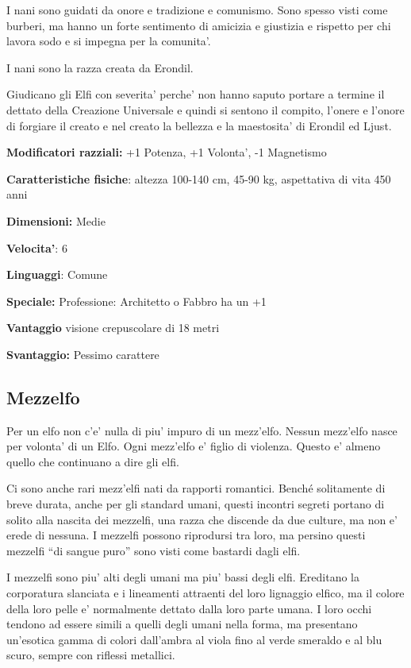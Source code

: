 \documentclass[a4paper,11pt,twoside,openany]{dndbook}
\begin{document}
I nani sono guidati da onore e tradizione e comunismo. Sono spesso visti come burberi, ma hanno un forte sentimento di amicizia e giustizia e rispetto per chi lavora sodo e si impegna per la comunita'.

I nani sono la razza creata da Erondil.

Giudicano gli Elfi con severita' perche' non hanno saputo portare a termine il dettato della Creazione Universale e quindi si sentono il compito, l'onere e l'onore di forgiare il creato e nel creato la bellezza e la maestosita' di Erondil ed Ljust. 

\textbf{Modificatori razziali:} +1 Potenza, +1 Volonta', -1 Magnetismo

\textbf{Caratteristiche fisiche}: altezza 100-140 cm, 45-90 kg, aspettativa
di vita 450 anni

\textbf{Dimensioni:} Medie

\textbf{Velocita'}: 6

\textbf{Linguaggi}: Comune

\textbf{Speciale:} Professione: Architetto o Fabbro ha un +1

\textbf{Vantaggio} visione crepuscolare di 18 metri

\textbf{Svantaggio:} Pessimo carattere

\subsection{Mezzelfo}

\label{mezzelfo}

Per un elfo non c'e' nulla di piu' impuro di un mezz'elfo. Nessun mezz'elfo nasce per volonta' di un Elfo. Ogni mezz'elfo e' figlio di violenza. Questo e' almeno quello che continuano a dire gli elfi.

Ci sono anche rari mezz'elfi nati da rapporti romantici. Benché solitamente di breve durata, anche per gli standard umani, questi incontri segreti portano di solito alla nascita dei mezzelfi, una razza che discende da due culture, ma non e' erede di nessuna. I mezzelfi possono riprodursi tra loro, ma persino questi mezzelfi ``di sangue puro'' sono visti come bastardi dagli elfi.

I mezzelfi sono piu' alti degli umani ma piu' bassi degli elfi. Ereditano la corporatura slanciata e i lineamenti attraenti del loro lignaggio elfico, ma il colore della loro pelle e' normalmente dettato dalla loro parte umana. I loro occhi tendono ad essere simili a quelli degli umani nella forma, ma presentano un'esotica gamma di colori dall'ambra al viola fino al verde smeraldo e al blu scuro, sempre con riflessi metallici.
\end{document}
